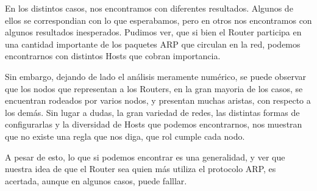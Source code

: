\documentclass[a4paper, 11pt]{article}
\begin{document}
En los distintos casos, nos encontramos con diferentes resultados. Algunos de ellos se correspondian con lo que esperabamos, pero en otros nos encontramos con algunos resultados inesperados.
Pudimos ver, que si bien el Router participa en una cantidad importante de los paquetes ARP que circulan en la red, podemos encontrarnos con distintos Hosts que cobran importancia.

Sin embargo, dejando de lado el an\'alisis meramente num\'erico, se puede observar que los nodos que representan a los Routers, en la gran mayoria de los casos, se encuentran rodeados por varios nodos, y presentan muchas aristas, con respecto a los dem\'as.
Sin lugar a dudas, la gran variedad de redes, las distintas formas de configurarlas y la diversidad de Hosts que podemos encontrarnos, nos muestran que no existe una regla que nos diga, que rol cumple cada nodo.

A pesar de esto, lo que si podemos encontrar es una generalidad, y ver que nuestra idea de que el Router sea quien m\'as utiliza el protocolo ARP, es acertada, aunque en algunos casos, puede falllar.
\end{document}
